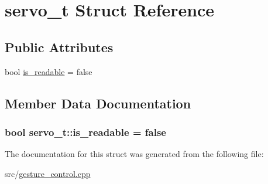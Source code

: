 \hypertarget{structservo__t}{}\section{servo\+\_\+t Struct Reference}
\label{structservo__t}
\subsection*{Public Attributes}
\begin{DoxyCompactItemize}
\item 
bool \hyperlink{structservo__t_a2d870f86b97b371fff86ac1c02f789f6}{is\+\_\+readable} = false
\end{DoxyCompactItemize}


\subsection{Member Data Documentation}
\subsubsection[{\texorpdfstring{is\+\_\+readable}{is_readable}}]{\setlength{\rightskip}{0pt plus 5cm}bool servo\+\_\+t\+::is\+\_\+readable = false}\hypertarget{structservo__t_a2d870f86b97b371fff86ac1c02f789f6}{}\label{structservo__t_a2d870f86b97b371fff86ac1c02f789f6}


The documentation for this struct was generated from the following file\+:\begin{DoxyCompactItemize}
\item 
src/\hyperlink{gesture__control_8cpp}{gesture\+\_\+control.\+cpp}\end{DoxyCompactItemize}
